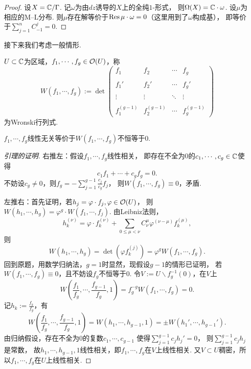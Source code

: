 \begin{proof}
	设$X=\mathbb{C}/\Gamma$. 记$\omega$为由$dz$诱导的$X$上的全纯$1$-形式，
    则$\Omega(X)=\mathbb{C} \cdot \omega$. 设$\mu$为相应的M--L分布. 
    则$\mu$存在解等价于$\operatorname{Res} \mu \cdot \omega=0$（这里用到了$\omega$构成基），
    即等价于$\sum\limits_{j=1}^n C^j_{-1}=0$.
\end{proof}

接下来我们考虑一般情形.
\begin{definition}
    $U\subset \mathbb{C}$为区域，$f_1,\cdots,f_g\in \mathcal{O}(U)$，称
    $$W(f_1,\cdots,f_g):=\det \begin{pmatrix}f_1 &f_2 &\cdots &f_g\\ \\
    f_1' &f_2' &\cdots &f_g'\\ \\ \vdots &\vdots &\ddots &\vdots\\ \\
    f_1^{(g-1)} &f_2^{(g-1)} &\cdots &f_g^{(g-1)} \end{pmatrix}$$
	为Wronski行列式.
\end{definition}

\begin{lemma}
	$f_1,\cdots,f_g$线性无关等价于$W(f_1,\cdots,f_g)$不恒等于$0$.
\end{lemma}

\begin{proof}[引理的证明]
	右推左：假设$f_1,\cdots,f_g$线性相关，
    即存在不全为$0$的$c_1,\cdots,c_g\in \mathbb{C}$使得
	$$c_1f_1+\cdots+c_gf_g=0.$$
	不妨设$c_g\neq 0$，则$f_g=-\sum\limits_{j=1}^{g-1} \frac{c_j}{c_g}f_j$，
    则$W(f_1,\cdots,f_g)\equiv 0$，矛盾.

	左推右：首先证明，若$h_j=\varphi \cdot f_j, \varphi\in \mathcal{O}(U)$，
    则$W(h_1,\cdots,h_g)=\varphi^g \cdot W(f_1,\cdots,f_j)$. 
    由Leibniz法则，
    \[h_k^{(\nu)}=\varphi\cdot f_k^{(\nu)}
    +\sum_{0\leq\mu<\nu} C_\nu^\mu \varphi^{(\nu-\mu)}f_k^{(\mu)},\]
    则
	$$W(h_1,\cdots,h_g)=\det(\varphi f_k^{(j)})=\varphi^g W(f_1,\cdots,f_g).$$
	回到原题，用数学归纳法，$g=1$时显然，现假设$g-1$的情形已证明，
    若$W(f_1,\cdots,f_g)\equiv0$，且不妨设$f_g$不恒等于$0$. 
    令$V:=U\backslash f_g^{-1}(0)$，在$V$上
	$$W\left(\frac{f_1}{f_g},\cdots,\frac{f_{g-1}}{f_g},1\right)
    =f_g^{-g}W(f_1,\cdots,f_g)=0.$$
	记$h_k:=\frac{f_k}{f_g}$，有
	$$W\left(\frac{f_1}{f_g},\cdots,\frac{f_{g-1}}{f_g},1\right)
    =W(h_1,\cdots,h_{g-1},1)=\pm W(h_1',\cdots,h_{g-1}').$$
	由归纳假设，存在不全为$0$的复数$c_1,\cdots,c_{g-1}$
    使得$\sum\limits_{j=1}^{g-1} c_j h_j'=0$，
    则$\sum\limits_{j=1}^{g-1} c_j h_j$是常数，
    故$h_1,\cdots,h_{g-1},1$线性相关，即$f_1,\cdots,f_g$在$V$上线性相关. 
    又$V\subset U$稠密，所以$f_1,\cdots,f_g$在$U$上线性相关.
\end{proof}

